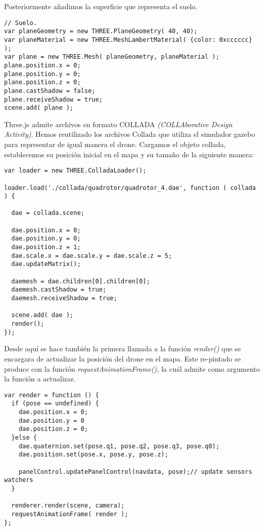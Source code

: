 Posteriormente añadimos la superficie que representa el suelo.\\

\begin{lstlisting}[caption=Superficie que representa el suelo del mapa.]
// Suelo. 
var planeGeometry = new THREE.PlaneGeometry( 40, 40);
var planeMaterial = new THREE.MeshLambertMaterial( {color: 0xcccccc} );
var plane = new THREE.Mesh( planeGeometry, planeMaterial );
plane.position.x = 0;
plane.position.y = 0;
plane.position.z = 0;
plane.castShadow = false;
plane.receiveShadow = true;
scene.add( plane );
\end{lstlisting}

Three.js admite archivos en formato COLLADA \emph{(COLLAborative Design Activity)}. Hemos reutilizado los archivos Collada que utiliza el simulador gazebo para representar de igual manera el drone. Cargamos el objeto collada, establecemos su posición inicial en el mapa y su tamaño de la siguiente manera:\\

\begin{lstlisting}[caption=Carga del objeto collada.]
var loader = new THREE.ColladaLoader();

loader.load('./collada/quadrotor/quadrotor_4.dae', function ( collada ) {
  
  dae = collada.scene;
  
  dae.position.x = 0;
  dae.position.y = 0;
  dae.position.z = 1;
  dae.scale.x = dae.scale.y = dae.scale.z = 5;
  dae.updateMatrix();
   
  daemesh = dae.children[0].children[0];
  daemesh.castShadow = true;
  daemesh.receiveShadow = true;
      
  scene.add( dae );
  render();
});
\end{lstlisting}

Desde aquí se hace también la primera llamada a la función \emph{render()} que se encargara de actualizar la posición del drone en el mapa. Este re-pintado se produce con la función \emph{requestAnimationFrame()}, la cuál admite como argumento la función a actualizar.

\begin{lstlisting}[caption=Actualización del lienzo.]
var render = function () {
  if (pose == undefined) {
    dae.position.x = 0;
    dae.position.y = 0
    dae.position.z = 0;
  }else {
    dae.quaternion.set(pose.q1, pose.q2, pose.q3, pose.q0);
    dae.position.set(pose.x, pose.y, pose.z);
      
    panelControl.updatePanelControl(navdata, pose);// update sensors watchers
  }

  renderer.render(scene, camera);
  requestAnimationFrame( render );
};
\end{lstlisting}

